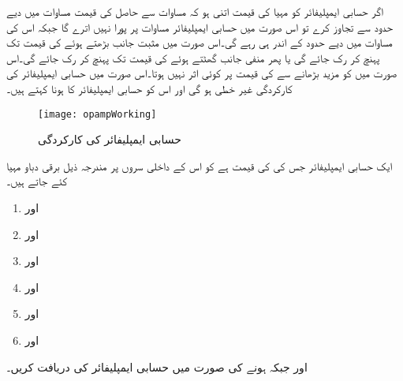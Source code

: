 اگر حسابی ایمپلیفائر کو مہیا  کی قیمت اتنی ہو کہ مساوات    سے حاصل  کی قیمت مساوات   میں دیے حدود سے تجاوز کرے تو اس صورت میں حسابی ایمپلیفائر مساوات   پر پورا نہیں اترے گا جبکہ اس کی     مساوات   میں دیے حدود کے اندر ہی رہے گی۔اس صورت میں مثبت جانب بڑھتے ہوئے  کی قیمت  تک پہنچ کر رک جائے گی یا پھر منفی جانب گھٹتے ہوئے  کی قیمت   تک پہنچ کر رک جائے گی۔اس صورت میں   کو مزید بڑھانے سے  کی قیمت پر کوئی اثر نہیں ہوتا۔اس صورت میں حسابی ایمپلیفائر کی کارکردگی غیر خطی ہو گی اور اس کو حسابی ایمپلیفائر کا 
  ہونا کہتے ہیں۔
\begin{figure}
\centering
\texttt{[image: opampWorking]}
\caption{حسابی ایمپلیفائر کی کارکردگی}
\label{شکل_حسابی_ایمپلیفائر_کی_کارکردگی}
\end{figure}
ایک حسابی ایمپلیفائر جس کی    کی قیمت  ہے کو اس کے داخلی سروں پر مندرجہ ذیل برقی دباو مہیا کئے جاتے ہیں۔
\begin{enumerate}
\item
{} اور 
\item
{} اور 
\item
{} اور 
\item
{} اور 
\item
{} اور 

\item
{} اور 
\end{enumerate}
اور  جبکہ  ہونے کی صورت میں حسابی ایمپلیفائر کی  دریافت کریں۔


